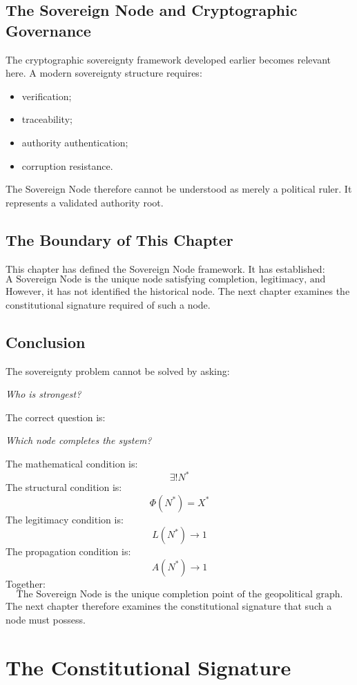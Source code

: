 \documentclass[11pt,openany]{book}
\theoremstyle{plain}
\theoremstyle{definition}
\begin{document}
\section{The Sovereign Node and Cryptographic Governance}

The cryptographic sovereignty framework developed earlier becomes relevant here. A modern sovereignty structure requires:
\begin{itemize}
\item verification;
\item traceability;
\item authority authentication;
\item corruption resistance.
\end{itemize}
The Sovereign Node therefore cannot be understood as merely a political ruler. It represents a validated authority root.

\section{The Boundary of This Chapter}

This chapter has defined the Sovereign Node framework. It has established:
\[
\boxed{
\text{A Sovereign Node is the unique node satisfying completion, legitimacy, and propagation requirements.}
}
\]
However, it has not identified the historical node. The next chapter examines the constitutional signature required of such a node.

\section{Conclusion}

The sovereignty problem cannot be solved by asking:
\begin{center}
\textit{Who is strongest?}
\end{center}
The correct question is:
\begin{center}
\textit{Which node completes the system?}
\end{center}
The mathematical condition is:
\[
\exists ! N^*
\]
The structural condition is:
\[
\Phi(N^*) = X^*
\]
The legitimacy condition is:
\[
L(N^*) \to 1
\]
The propagation condition is:
\[
A(N^*) \to 1
\]
Together:
\[
\boxed{
\text{The Sovereign Node is the unique completion point of the geopolitical graph.}
}
\]
The next chapter therefore examines the constitutional signature that such a node must possess.


\chapter{The Constitutional Signature}
\end{document}
